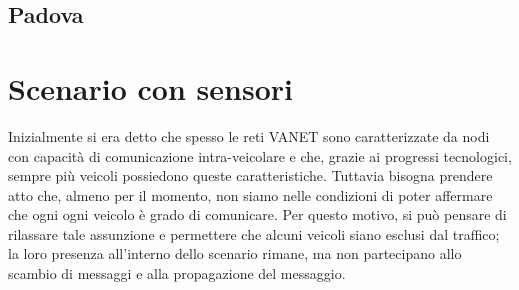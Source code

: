 \subsection{Padova}\label{subsec:risultati-pd}


%
\section{Scenario con sensori}
Inizialmente si era detto che spesso le reti VANET sono caratterizzate da nodi con capacità di comunicazione
intra-veicolare e che, grazie ai progressi tecnologici, sempre più veicoli possiedono queste caratteristiche.
Tuttavia bisogna prendere atto che, almeno per il momento, non siamo nelle condizioni
di poter affermare che ogni ogni veicolo è grado di comunicare.
Per questo motivo, si può pensare di rilassare tale assunzione e permettere che alcuni veicoli
siano esclusi dal traffico; la loro presenza all'interno dello scenario rimane, ma non partecipano allo scambio
di messaggi e alla propagazione del messaggio.

